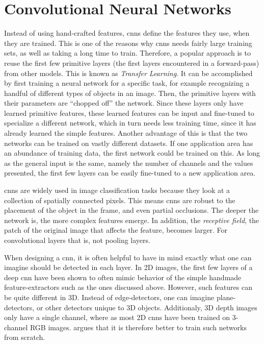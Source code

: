 \section{Convolutional Neural Networks}\label{sec:background_cnn}
Instead of using hand-crafted features, \gls{cnn}s define the features they use, when they are trained. This is one of the reasons why \gls{cnn}s needs fairly large training sets, as well as taking a long time to train. Therefore, a popular approach is to reuse the first few primitive layers (the first layers encountered in a forward-pass) from other models. This is known as \emph{Transfer Learning}. It can be accomplished by first training a neural network for a specific task, for example recognizing a handful of different types of objects in an image. Then, the primitive layers with their parameters are ``chopped off'' the network. Since these layers only have learned primitive features, these learned features can be input and fine-tuned to specialize a different network, which in turn needs less training time, since it has already learned the simple features. Another advantage of this is that the two networks can be trained on vastly different datasets. If one application area has an abundance of training data, the first network could be trained on this. As long as the general input is the same, namely the number of channels and the values presented, the first few layers can be easily fine-tuned to a new application area.

\gls{cnn}s are widely used in image classification tasks because they look at a collection of spatially connected pixels. This means \gls{cnn}s are robust to the placement of the object in the frame, and even partial occlusions. The deeper the network is, the more complex features emerge. In addition, the \emph{receptive field}, the patch of the original image that affects the feature, becomes larger. For convolutional layers that is, not pooling layers.

When designing a \gls{cnn}, it is often helpful to have in mind exactly what one can imagine should be detected in each layer. In 2D images, the first few layers of a deep \gls{cnn} have been shown to often mimic behavior of the simple handmade feature-extractors such as the ones discussed above. However, such features can be quite different in 3D. Instead of edge-detectors, one can imagine plane-detectors, or other detectors unique to 3D objects. Additionaly, 3D depth images only have a single channel, where as most 2D \gls{cnn}s have been trained on 3-channel RGB images. \cite{song2018depth} argues that it is therefore better to train such networks from scratch.

